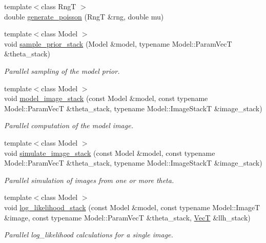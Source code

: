 \begin{DoxyCompactItemize}
\item 
{\footnotesize template$<$class RngT $>$ }\\double \hyperlink{namespacemappel_adc1e3a6c0fd4804406d162c48d805d44}{generate\+\_\+poisson} (RngT \&rng, double mu)
\item 
{\footnotesize template$<$class Model $>$ }\\void \hyperlink{namespacemappel_afc24dba55dd63a1628388626bb7a7304}{sample\+\_\+prior\+\_\+stack} (Model \&model, typename Model\+::\+Param\+VecT \&theta\+\_\+stack)
\begin{DoxyCompactList}\small\item\em Parallel sampling of the model prior. \end{DoxyCompactList}\item 
{\footnotesize template$<$class Model $>$ }\\void \hyperlink{namespacemappel_ac0a6248ecc5b41b2d7fe10231dcc00cb}{model\+\_\+image\+\_\+stack} (const Model \&model, const typename Model\+::\+Param\+VecT \&theta\+\_\+stack, typename Model\+::\+Image\+StackT \&image\+\_\+stack)
\begin{DoxyCompactList}\small\item\em Parallel computation of the model image. \end{DoxyCompactList}\item 
{\footnotesize template$<$class Model $>$ }\\void \hyperlink{namespacemappel_a79ac0dd997da8729f9610aab0fdbb347}{simulate\+\_\+image\+\_\+stack} (const Model \&model, const typename Model\+::\+Param\+VecT \&theta\+\_\+stack, typename Model\+::\+Image\+StackT \&image\+\_\+stack)
\begin{DoxyCompactList}\small\item\em Parallel simulation of images from one or more theta. \end{DoxyCompactList}\item 
{\footnotesize template$<$class Model $>$ }\\void \hyperlink{namespacemappel_ac37bf1175da6d4a80cd4cb147bfb68e2}{log\+\_\+likelihood\+\_\+stack} (const Model \&model, const typename Model\+::\+ImageT \&image, const typename Model\+::\+Param\+VecT \&theta\+\_\+stack, \hyperlink{namespacemappel_a2225ad69f358daa3f4f99282a35b9a3a}{VecT} \&llh\+\_\+stack)
\begin{DoxyCompactList}\small\item\em Parallel log\+\_\+likelihood calculations for a single image. \end{DoxyCompactList}\item 

\end{DoxyCompactItemize}
